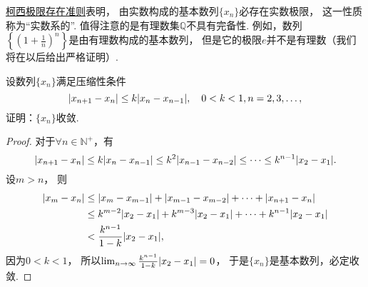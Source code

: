 \hyperref[theorem:极限.数列的柯西极限存在准则]{柯西极限存在准则}表明，
由实数构成的基本数列\(\{x_n\}\)必存在实数极限，
这一性质称为“实数系的”.
值得注意的是有理数集\(\mathbb{Q}\)不具有完备性.
例如，数列\(\left\{\left(1+\frac1n\right)^n\right\}\)是由有理数构成的基本数列，
但是它的极限\(e\)并不是有理数（我们将在以后给出严格证明）.%

\begin{example}
设数列\(\{x_n\}\)满足压缩性条件\[
	\abs{x_{n+1} - x_n}
	\leq k \abs{x_n - x_{n-1}},
	\quad 0<k<1, n=2,3,\dotsc,
\]
证明：\(\{x_n\}\)收敛.
\begin{proof}
对于\(\forall n\in\mathbb{N}^+\)，有\[
	\abs{x_{n+1} - x_n}
	\leq k \abs{x_n - x_{n-1}}
	\leq k^2 \abs{x_{n-1} - x_{n-2}}
	\leq \dotsb
	\leq k^{n-1} \abs{x_2 - x_1}.
\]
设\(m > n\)，
则\begin{align*}
	\abs{x_m - x_n}
	&\leq \abs{x_m - x_{m-1}}
	+ \abs{x_{m-1} - x_{m-2}}
	+ \dotsb + \abs{x_{n+1} - x_n} \\
	&\leq k^{m-2} \abs{x_2 - x_1}
	+ k^{m-3} \abs{x_2 - x_1}
	+ \dotsb + k^{n-1} \abs{x_2 - x_1} \\
	&< \frac{k^{n-1}}{1-k} \abs{x_2 - x_1},
\end{align*}
因为\(0<k<1\)，
所以\(\lim_{n\to\infty} \frac{k^{n-1}}{1-k} \abs{x_2 - x_1} = 0\)，
于是\(\{x_n\}\)是基本数列，必定收敛.
\end{proof}
\end{example}
